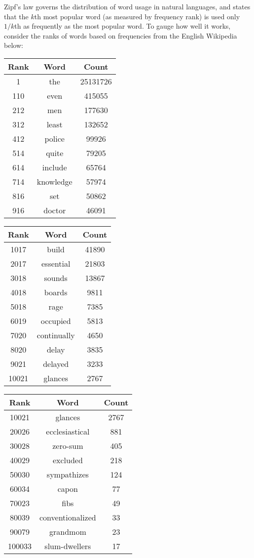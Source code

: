 \documentclass[10pt]{article}
\begin{document}
Zipf's law governs the distribution of word usage in natural languages, and states that the $k$th most popular word (as measured by frequency rank) is used only $1/k$th as frequently as the most popular word. To gauge how well it works, consider the ranks of words based on frequencies from the English Wikipedia below:

\begin{center}
\begin{tabular}{c|c|c}
Rank & Word & Count \\
\hline
1 & the & 25131726 \\
110 & even & 415055 \\
212 & men & 177630 \\
312 & least & 132652 \\
412 & police & 99926 \\
514 & quite & 79205 \\
614 & include & 65764 \\
714 & knowledge & 57974 \\
816 & set & 50862 \\
916 & doctor & 46091 \\
\end{tabular}
\end{center}

\begin{center}
\begin{tabular}{c|c|c}
Rank & Word & Count \\
\hline
1017 & build & 41890 \\
2017 & essential & 21803 \\
3018 & sounds & 13867 \\
4018 & boards & 9811 \\
5018 & rage & 7385 \\
6019 & occupied & 5813 \\
7020 & continually & 4650 \\
8020 & delay & 3835 \\
9021 & delayed & 3233 \\
10021 & glances & 2767 \\
\end{tabular}
\end{center}

\begin{center}
\begin{tabular}{c|c|c}
Rank & Word & Count \\
\hline
10021 & glances & 2767 \\
20026 & ecclesiastical & 881 \\
30028 & zero-sum & 405 \\
40029 & excluded & 218 \\
50030 & sympathizes & 124 \\
60034 & capon & 77 \\
70023 & fibs & 49 \\
80039 & conventionalized & 33 \\
90079 & grandmom & 23 \\
100033 & slum-dwellers & 17 \\
\end{tabular}
\end{center}
\end{document}

